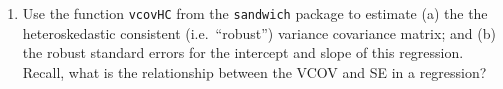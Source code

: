 \documentclass[
]{book}
\newenvironment{Shaded}{\begin{snugshade}}{\end{snugshade}}
\newcommand{\AttributeTok}[1]{\textcolor[rgb]{0.77,0.63,0.00}{#1}}
\newcommand{\DecValTok}[1]{\textcolor[rgb]{0.00,0.00,0.81}{#1}}
\newcommand{\FloatTok}[1]{\textcolor[rgb]{0.00,0.00,0.81}{#1}}
\newcommand{\FunctionTok}[1]{\textcolor[rgb]{0.00,0.00,0.00}{#1}}
\newcommand{\NormalTok}[1]{#1}
\newcommand{\OtherTok}[1]{\textcolor[rgb]{0.56,0.35,0.01}{#1}}
\newcommand{\SpecialCharTok}[1]{\textcolor[rgb]{0.00,0.00,0.00}{#1}}
\newcommand{\StringTok}[1]{\textcolor[rgb]{0.31,0.60,0.02}{#1}}
\providecommand{\tightlist}{%
  \setlength{\itemsep}{0pt}\setlength{\parskip}{0pt}}
\theoremstyle{definition}
\theoremstyle{definition}
\theoremstyle{definition}
\theoremstyle{definition}
\theoremstyle{remark}
\begin{document}
\begin{enumerate}
\def\labelenumi{\arabic{enumi}.}
\setcounter{enumi}{1}
\tightlist
\item
  Use the function \texttt{vcovHC} from the \texttt{sandwich} package to estimate (a) the the heteroskedastic consistent (i.e.~``robust'') variance covariance matrix; and (b) the robust standard errors for the intercept and slope of this regression. Recall, what is the relationship between the VCOV and SE in a regression?
\end{enumerate}

\begin{Shaded}
\end{Shaded}
\end{document}
